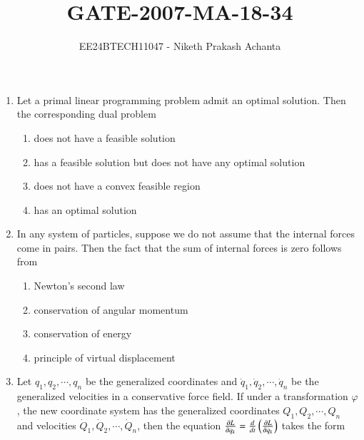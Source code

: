 \documentclass[journal]{IEEEtran}
\renewcommand{\thefigure}{\theenumi}
\renewcommand{\thetable}{\theenumi}
\numberwithin{equation}{enumi}
\numberwithin{figure}{enumi}
\renewcommand{\thetable}{\theenumi}
\begin{document}

\vspace{3cm}

\title{GATE-2007-MA-18-34}
\author{EE24BTECH11047 - Niketh Prakash Achanta}
{\let\newpage\relax\maketitle}
\renewcommand{\thefigure}{\theenumi}
\renewcommand{\thetable}{\theenumi}
\begin{enumerate}[start=18]
\item Let a primal linear programming problem admit an optimal solution. Then the corresponding dual problem
    \begin{enumerate}
        \item does not have a feasible solution
        \item has a feasible solution but does not have any optimal solution
        \item does not have a convex feasible region
        \item has an optimal solution
    \end{enumerate}
\item In any system of particles, suppose we do not assume that the internal forces come in pairs. Then the fact that the sum of internal forces is zero follows from
    \begin{enumerate}
        \item Newton's second law
        \item conservation of angular momentum
        \item conservation of energy
        \item principle of virtual displacement
    \end{enumerate}
\item Let $q_1, q_2, \cdots, q_n$ be the generalized coordinates and $\dot{q}_1, \dot{q}_2, \cdots, \dot{q}_n$ be the generalized velocities in a conservative force field. If under a transformation $\varphi$, the new coordinate system has the generalized coordinates $Q_1, Q_2, \cdots, Q_n$ and velocities $\dot{Q}_1, \dot{Q}_2, \cdots, \dot{Q}_n$, then the equation $\frac{\partial L}{\partial \dot{q}_k} = \frac{d}{dt} \left(\frac{\partial L}{\partial \dot{q}_k}\right)$
takes the form
    \begin{enumerate}

\end{enumerate}
\end{enumerate}
\end{document}
